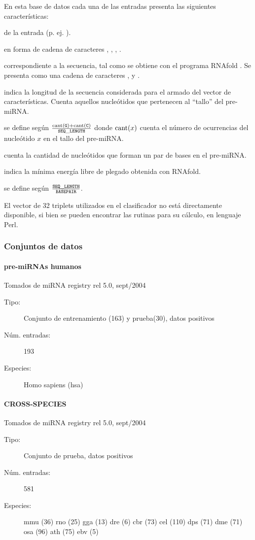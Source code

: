 \documentclass[12pt,bibliography=oldstyle,DIV=12,parskip=half-,titlepage]{scrartcl}
\begin{document}
En esta base de datos cada una de las entradas presenta las siguientes
características:
\begin{description}
  [style=nextline,leftmargin=4cm,font=\tt,itemsep=4pt]
%
\item[identificador] de la entrada (p. ej. ).
%
\item[secuencia] en forma de cadena de caracteres , ,
  , .
%
\item[estructura secundaria] correspondiente a la secuencia, tal como
  se obtiene con el programa RNAfold \cite{vienna}. Se presenta como
  una cadena de caracteres \mono{(},  y \mono{)}.
%
\item[SEQ\_LENGTH] indica la longitud de la secuencia
  considerada para el armado del vector de características. Cuenta
  aquellos nucleótidos que pertenecen al ``tallo'' del pre-miRNA.
%
\item[GC\_CONTENT] se define según
  $\frac{\textrm{cant}({\tt G})+\textrm{cant}({\tt C})}{{\tt SEQ\_LENGTH}}$
  donde $\textrm{cant}(x)$ cuenta el número de ocurrencias del nucleótido
  $x$ en el tallo del pre-miRNA.
%
\item[BASEPAIR] cuenta la cantidad de nucleótidos
  que forman un par de bases en el pre-miRNA.
%
\item[FREE\_ENERGY] indica la mínima energía libre de plegado
  obtenida con RNAfold.
%
\item[LEN\_BP\_RATIO] se define según
  $\frac{{\tt SEQ\_LENGTH}}{{\tt BASEPAIR}}$.
\end{description}
%
El vector de 32 triplets utilizados en el clasificador no está
directamente disponible, si bien se pueden encontrar las rutinas para su
cálculo, en lenguaje Perl.
%
\subsubsection{Conjuntos de datos}
\paragraph{pre-miRNAs humanos}
Tomados de miRNA registry rel 5.0, sept/2004
\begin{description}
\item[Tipo:] Conjunto de entrenamiento (163) y prueba(30), datos
  positivos
\item[Núm. entradas:] 193
\item[Especies:] Homo sapiens (hsa)
\end{description}
\paragraph{CROSS-SPECIES}
Tomados de miRNA registry rel 5.0, sept/2004
\begin{description}
\item[Tipo:] Conjunto de prueba, datos positivos
\item[Núm. entradas:] 581
\item[Especies:]
  \quad mmu (36)
  \quad rno (25)
  \quad gga (13)
  \quad dre (6)
  \quad cbr (73)
  \quad cel (110)
  \quad dps (71)
  \quad dme (71)
  \quad osa (96)
  \quad ath (75)
  \quad ebv (5)
\end{description}
%
\end{document}
